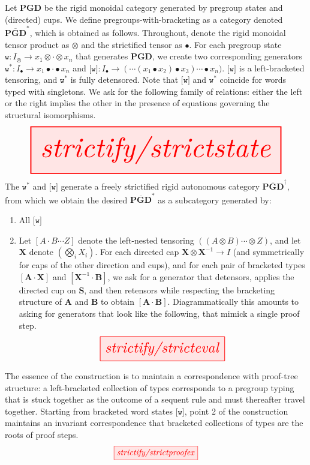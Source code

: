 \begin{construction}\label{cons:bracketing}
Let $\mathbf{PGD}$ be the rigid monoidal category generated by pregroup states and (directed) cups. We define pregroups-with-bracketing as a category denoted $\overline{\mathbf{PGD}}^*$, which is obtained as follows. Throughout, denote the rigid monoidal tensor product as $\otimes$ and the strictified tensor as $\bullet$. For each pregroup state $\texttt{w} : I_\otimes \rightarrow x_1 \otimes \cdot \otimes x_n$ that generates $\mathbf{PGD}$, we create two corresponding generators $\texttt{w}^* : I_\bullet \rightarrow x_1 \bullet \cdot \bullet x_n$ and $\texttt{[w]} : I_\bullet \rightarrow (\cdots(x_1 \bullet x_2) \bullet x_3) \cdots \bullet x_n)$. $\texttt{[w]}$ is a left-bracketed tensoring, and $\texttt{w}^*$ is fully detensored. Note that $\texttt{[w]}$ and $\texttt{w}^*$ coincide for words typed with singletons. We ask for the following family of relations: either the left or the right implies the other in the presence of equations governing the structural isomorphisms.
\[\resizebox{\textwidth}{!}{\tikzfig{strictify/strictstate}}\]
The $\texttt{w}^*$ and $\texttt{[w]}$ generate a freely strictified rigid autonomous category $\overline{\mathbf{PGD}}^\dagger$, from which we obtain the desired $\overline{\mathbf{PGD}}^*$ as a subcategory generated by:

\begin{enumerate}
\item{All $\texttt{[w]}$}
\item Let $[A \cdot B \cdots Z]$ denote the left-nested tensoring $((A \otimes B) \cdots \otimes Z)$, and let $\mathbf{X}$ denote $(\bigotimes\limits_i X_i)$. For each directed cap $\mathbf{X} \otimes \mathbf{X}^{-1} \rightarrow I$ (and symmetrically for caps of the other direction and cups), and for each pair of bracketed types $[\mathbf{A} \cdot \mathbf{X}]$ and $[\mathbf{X}^{-1} \cdot \mathbf{B}]$, we ask for a generator that detensors, applies the directed cup on \textbf{S}, and then retensors while respecting the bracketing structure of \textbf{A} and \textbf{B} to obtain $[\mathbf{A} \cdot \mathbf{B}]$. Diagrammatically this amounts to asking for generators that look like the following, that mimick a single proof step.
\[\resizebox{0.5\textwidth}{!}{\tikzfig{strictify/stricteval}}\]
\end{enumerate}
\end{construction}

\begin{example}\label{ex:prooftree}
The essence of the construction is to maintain a correspondence with proof-tree structure: a left-bracketed collection of types corresponds to a pregroup typing that is stuck together as the outcome of a sequent rule and must thereafter travel together. Starting from bracketed word states $\texttt{[w]}$, point 2 of the construction maintains an invariant correspondence that bracketed collections of types are the roots of proof steps.
\[\tikzfig{strictify/strictproofex}\]
\end{example}

